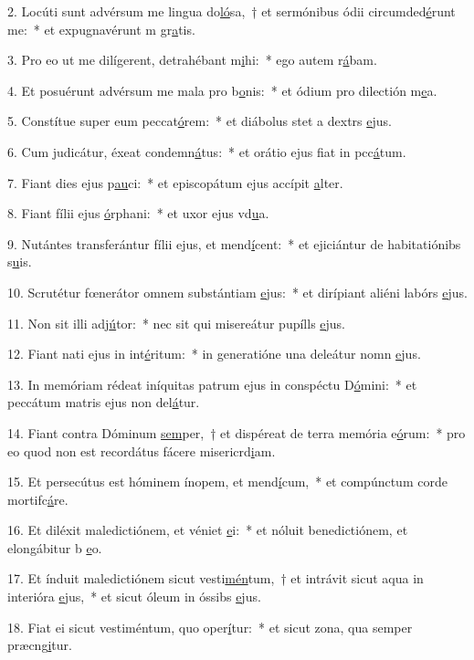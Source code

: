 2. Locúti sunt advérsum me lingua do\uline{ló}sa,~† et sermónibus ódii circumded\uline{é}runt me:~* et expugnavérunt m gr\uline{a}tis.\par 
3. Pro eo ut me dilígerent, detrahébant m\uline{i}hi:~* ego autem r\uline{á}bam.\par 
4. Et posuérunt advérsum me mala pro b\uline{o}nis:~* et ódium pro dilectión m\uline{e}a.\par 
5. Constítue super eum peccat\uline{ó}rem:~* et diábolus stet a dextrs \uline{e}jus.\par 
6. Cum judicátur, éxeat condemn\uline{á}tus:~* et orátio ejus fiat in pcc\uline{á}tum.\par 
7. Fiant dies ejus p\uline{au}ci:~* et episcopátum ejus accípit \uline{a}lter.\par 
8. Fiant fílii ejus \uline{ó}rphani:~* et uxor ejus vd\uline{u}a.\par 
9. Nutántes transferántur fílii ejus, et mend\uline{í}cent:~* et ejiciántur de habitatiónibs s\uline{u}is.\par 
10. Scrutétur fœnerátor omnem substántiam \uline{e}jus:~* et dirípiant aliéni labórs \uline{e}jus.\par 
11. Non sit illi adj\uline{ú}tor:~* nec sit qui misereátur pupílls \uline{e}jus.\par 
12. Fiant nati ejus in int\uline{é}ritum:~* in generatióne una deleátur nomn \uline{e}jus.\par 
13. In memóriam rédeat iníquitas patrum ejus in conspéctu D\uline{ó}mini:~* et peccátum matris ejus non del\uline{á}tur.\par 
14. Fiant contra Dóminum \uline{sem}per,~† et dispéreat de terra memória e\uline{ó}rum:~* pro eo quod non est recordátus fácere misericrd\uline{i}am.\par 
15. Et persecútus est hóminem ínopem, et mend\uline{í}cum,~* et compúnctum corde mortifc\uline{á}re.\par 
16. Et diléxit maledictiónem, et véniet \uline{e}i:~* et nóluit benedictiónem, et elongábitur b \uline{e}o.\par 
17. Et índuit maledictiónem sicut vesti\uline{mén}tum,~† et intrávit sicut aqua in interióra \uline{e}jus,~* et sicut óleum in óssibs \uline{e}jus.\par 
18. Fiat ei sicut vestiméntum, quo oper\uline{í}tur:~* et sicut zona, qua semper præcng\uline{i}tur.\par 
